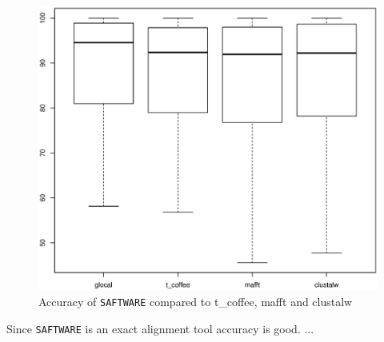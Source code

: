 \documentclass[a4paper,10pt]{article}
\newcommand{\TODO}[1]{\begingroup\color{red}#1\endgroup}
\newcommand{\SAFTWARE}{\TODO{\texttt{SAFTWARE}}}
\begin{document}
{\begin{figure}
  \begin{center}
    \includegraphics[width=1\columnwidth]{ac.eps}
  \end{center}
  \label{fig:ac}
  \caption{Accuracy of \SAFTWARE{} compared to t\_coffee, mafft and clustalw}
\end{figure}
Since \SAFTWARE{} is an exact alignment tool accuracy is good. ... 

}
\end{document}

